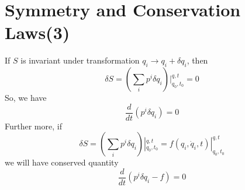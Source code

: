 \documentclass{article}
\begin{document}
\section{Symmetry and Conservation Laws(3)}
If $S$ is invariant under transformation
$q_i \rightarrow q_i + \delta q_i$, then 
\[\delta S = (\sum_i p^i \delta q_i) |_{q_0,t_0}^{q,t} = 0\]
So, we have
\[\frac{d}{dt} (p^i \delta q_i) = 0\]
Further more, if
\[\delta S = (\sum_i p^i \delta q_i) |_{q_0,t_0}^{q,t} =  f(q_i,\dot{q}_i,t)|_{q_0,t_0}^{q,t}\]
we will have conserved quantity
\[\frac{d}{dt} (p^i \delta q_i -f) = 0\]
\end{document}
